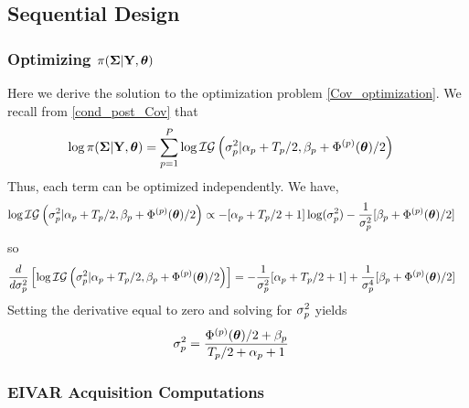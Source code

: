 \documentclass[12pt]{article}
\begin{document}
\subsection{Sequential Design}
\subsubsection{Optimizing $\pi(\boldsymbol{\Sigma}|\mathbf{Y}, \boldsymbol{\theta})$}
Here we derive the solution to the optimization problem \ref{Cov_optimization}. We recall from \ref{cond_post_Cov} that 
\begin{align*}
\log \pi(\boldsymbol{\Sigma}|\mathbf{Y}, \boldsymbol{\theta}) &= \sum_{p = 1}^{P} \log \mathcal{IG}\left(\sigma_{p}^2|\alpha_{p} + T_{p}/2, \beta_{p} + \Phi^{(p)}(\boldsymbol{\theta})/2 \right)
\end{align*}
Thus, each term can be optimized independently. We have, 
\begin{align*}
\log \mathcal{IG}\left(\sigma_{p}^2|\alpha_{p} + T_{p}/2, \beta_{p} + \Phi^{(p)}(\boldsymbol{\theta})/2 \right) &\propto -[\alpha_{p} + T_{p}/2 + 1]\log(\sigma^2_{p})
																									       - \frac{1}{\sigma^2_{p}} [\beta_{p} + \Phi^{(p)}(\boldsymbol{\theta})/2]
\end{align*}
so 
\begin{align*}
\frac{d}{d\sigma_{p}^2}\left[\log \mathcal{IG}\left(\sigma_{p}^2|\alpha_{p} + T_{p}/2, \beta_{p} + \Phi^{(p)}(\boldsymbol{\theta})/2 \right)\right] &= -\frac{1}{\sigma_{p}^2}[\alpha_{p} + T_{p}/2 + 1] + \frac{1}{\sigma_{p}^4} [\beta_{p} + \Phi^{(p)}(\boldsymbol{\theta})/2]
\end{align*}
Setting the derivative equal to zero and solving for $\sigma^2_{p}$ yields
\begin{align*}
\sigma_{p}^2 &= \frac{\Phi^{(p)}(\boldsymbol{\theta})/2 + \beta_{p}}{T_{p}/2 + \alpha_{p} + 1}
\end{align*}


\subsubsection{EIVAR Acquisition Computations}
\end{document}
